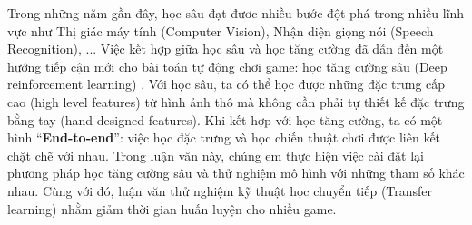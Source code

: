 Trong những năm gần đây, học sâu đạt đươc nhiều bước đột phá trong nhiều lĩnh vực như Thị giác máy tính (Computer Vision), Nhận diện giọng nói (Speech Recognition), ...  Việc kết hợp giữa học sâu và học tăng cường đã dẫn đến một hướng tiếp cận mới cho bài toán tự động chơi game: học tăng cường sâu (Deep reinforcement learning) \cite{mnihdqn2015}. Với học sâu, ta có thể học được những đặc trưng cấp cao (high level features) từ hình ảnh thô mà không cần phải tự thiết kế đặc trưng bằng tay (hand-designed features). Khi kết hợp với học tăng cường, ta có một hình ``\textbf{End-to-end}'': việc học đặc trưng và học chiến thuật chơi được liên kết chặt chẽ với nhau. Trong luận văn này, chúng em thực hiện việc cài đặt lại phương pháp học tăng cường sâu và thử nghiệm mô hình với những tham số khác nhau. Cùng với đó, luận văn thử nghiệm kỹ thuật học chuyển tiếp (Transfer learning) nhằm giảm thời gian huấn luyện cho nhiều game.